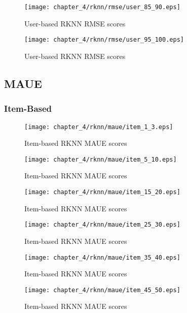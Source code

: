 \begin{figure}[H]
\centering
\texttt{[image: chapter\_4/rknn/rmse/user\_85\_90.eps]}
\caption{User-based RKNN RMSE scores}
\end{figure}

\begin{figure}[H]
\centering
\texttt{[image: chapter\_4/rknn/rmse/user\_95\_100.eps]}
\caption{User-based RKNN RMSE scores}
\end{figure}

\subsection{MAUE}

\subsubsection{Item-Based}

\begin{figure}[H]
\centering
\texttt{[image: chapter\_4/rknn/maue/item\_1\_3.eps]}
\caption{Item-based RKNN MAUE scores}
\end{figure}

\begin{figure}[H]
\centering
\texttt{[image: chapter\_4/rknn/maue/item\_5\_10.eps]}
\caption{Item-based RKNN MAUE scores}
\end{figure}

\begin{figure}[H]
\centering
\texttt{[image: chapter\_4/rknn/maue/item\_15\_20.eps]}
\caption{Item-based RKNN MAUE scores}
\end{figure}

\begin{figure}[H]
\centering
\texttt{[image: chapter\_4/rknn/maue/item\_25\_30.eps]}
\caption{Item-based RKNN MAUE scores}
\end{figure}

\begin{figure}[H]
\centering
\texttt{[image: chapter\_4/rknn/maue/item\_35\_40.eps]}
\caption{Item-based RKNN MAUE scores}
\end{figure}

\begin{figure}[H]
\centering
\texttt{[image: chapter\_4/rknn/maue/item\_45\_50.eps]}
\caption{Item-based RKNN MAUE scores}
\end{figure}

